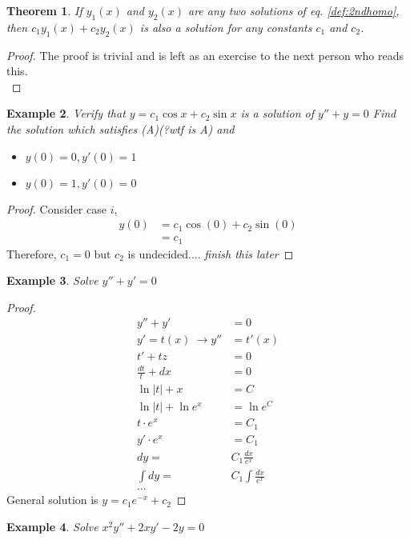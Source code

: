 \documentclass[oneside,11pt,pdftex,final]{book}%
\numberwithin{equation}{section}
\newtheorem{theorem}{Theorem}[chapter]%
\newtheorem{example}[theorem]{Example}
\numberwithin{section}{chapter}
\numberwithin{equation}{chapter}
\begin{document}
\begin{theorem}
	If $ y_1(x) $ and $ y_2(x) $ are any two solutions of eq. \ref{def:2ndhomo}, then $ c_1y_1(x) +c_2 y_2 (x)$ is also a solution for any constants $ c_1 $ and $ c_2 $.
\end{theorem}
\begin{proof}
	The proof is trivial and is left as an exercise to the next person who reads this.\\
\end{proof}

\begin{example}
	Verify that $ y=c_1 \cos x + c_2 \sin x $ is a solution of $ y''+y=0 $ Find the solution which satisfies (A)(?wtf is A) and
	\begin{itemize}
		\item $ y(0) =0, y'(0)=1$
		\item $ y(0)=1, y'(0)=0 $
	\end{itemize}
\end{example}

\begin{proof}
	Consider case $ i $,
	\begin{align*}
		y(0)&=c_1 \cos (0)+ c_2 \sin (0)\\
		&=c_1
	\end{align*}
	Therefore, $ c_1=0 $ but $ c_2 $ is undecided.... \emph{finish this later}
\end{proof}

\begin{example}
	Solve $ y''+y'=0 $
\end{example}
\begin{proof}
	\begin{align*}
	y''+y'&=0 \\ 
	y'=t(x) \ \to y''&=t'(x) 
	\\ t'+tz&=0 \\ 
	\frac{dt}{t}+dx&=0 \\
	 \ln |t|+x&=C \\ 
	 \ln|t| + \ln e^x &= \ln e^{C} \\ 
	 t \cdot  e^x&=C_1 \\ 
	 y' \cdot e^x &=C_1 \\ 
	 dy=&C_1\frac{dx}{e^x} \\ 
	 \int dy=&C_1 \int \frac{dx}{e^x} \\ ...
	\end{align*}
General solution is $ y=c_1e^{-x}+c_2 $	
\end{proof}

\begin{example}
	Solve $ x^2y''+2xy'-2y=0 $
\end{example}
\end{document}

